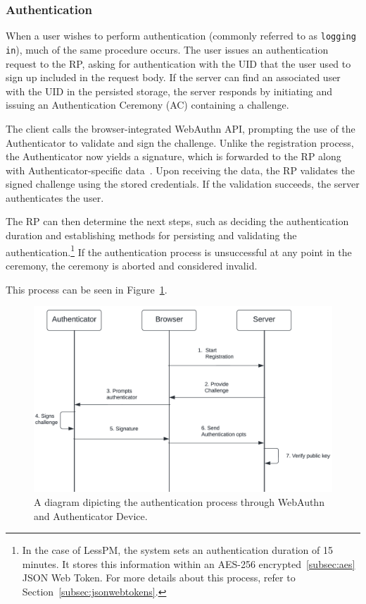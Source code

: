 \subsubsection{Authentication}\label{subsubsec:authentication}
When a user wishes to perform authentication (commonly referred to as \texttt{logging in}), much of the same procedure
occurs.
The user issues an authentication request to the RP, asking for authentication
with the UID that the user used to sign up included in the request body.
If the server can find an associated user with the UID in the persisted storage,
the server responds by initiating and issuing an Authentication Ceremony (AC)
containing a challenge.

The client calls the browser-integrated WebAuthn API, prompting the use of the
Authenticator to validate and sign the challenge.
Unlike the registration process, the Authenticator now yields a signature, which is forwarded to the RP along with
Authenticator-specific data~\cite{webauthn_authenticator_data}.
Upon receiving the data, the RP validates the signed challenge using the stored credentials.
If the validation succeeds, the server authenticates the user.

The RP can then determine the next steps, such as deciding the authentication
duration and establishing methods for persisting and validating the
authentication.\footnote{
  In the case of LessPM, the system sets an authentication duration of 15 minutes.
  It stores this information within an AES-256 encrypted~\ref{subsec:aes} JSON
  Web Token.
  For more details about this process, refer to Section~\ref{subsec:jsonwebtokens}.
} If the authentication process is unsuccessful at any point in the ceremony,
the ceremony is aborted and considered invalid.

This process can be seen in Figure~\ref{fig:authentication}.

\begin{figure}[htbp]
  \centering
  \includegraphics[width=0.75\linewidth]{images/Authentication}
  \caption{\footnotesize A diagram dipicting the authentication process through WebAuthn and Authenticator Device.}
  \label{fig:authentication}
\end{figure}